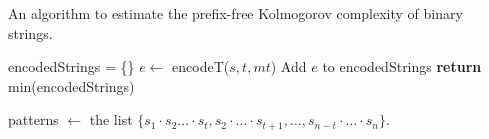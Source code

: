 \documentclass[12pt]{amsart}
\theoremstyle{definition}
\theoremstyle{remark}
\theoremstyle{definition}
\theoremstyle{remark}
\begin{document}
		\begin{algorithm}
			\caption{An algorithm to estimate the prefix-free Kolmogorov complexity of binary strings.}
			\begin{algorithmic}
					\State encodedStrings = \{\} 
						\State $e \gets$ encodeT($s,t,mt$) 
						\State Add $e$ to encodedStrings
					\EndFor
					\State \textbf{return} min(encodedStrings) 
				\EndProcedure

				\State patterns $\gets$ the list $\{s_1 \cdot s_2 \dots \cdot s_t, s_2 \cdot \dots \cdot s_{t+1},\dots,s_{n-t} \cdot \dots \cdot s_n \}$.					
				\EndFunction
			\end{algorithmic}
		\end{algorithm}

	
	
\end{document}
